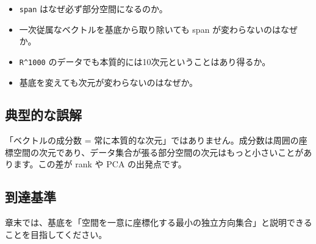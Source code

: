 \documentclass[
  11pt,
  a4paper,
]{ltjsarticle}
\providecommand{\tightlist}{%
  \setlength{\itemsep}{0pt}\setlength{\parskip}{0pt}}
\begin{document}
\begin{itemize}
\tightlist
\item
  \texttt{span} はなぜ必ず部分空間になるのか。
\item
  一次従属なベクトルを基底から取り除いても span が変わらないのはなぜか。
\item
  \texttt{R\^{}1000}
  のデータでも本質的には10次元ということはあり得るか。
\item
  基底を変えても次元が変わらないのはなぜか。
\end{itemize}

\hypertarget{ux5178ux578bux7684ux306aux8aa4ux89e3}{%
\subsection{典型的な誤解}\label{ux5178ux578bux7684ux306aux8aa4ux89e3}}

「ベクトルの成分数 =
常に本質的な次元」ではありません。成分数は周囲の座標空間の次元であり、データ集合が張る部分空間の次元はもっと小さいことがあります。この差が
rank や PCA の出発点です。

\hypertarget{ux5230ux9054ux57faux6e96}{%
\subsection{到達基準}\label{ux5230ux9054ux57faux6e96}}

章末では、基底を「空間を一意に座標化する最小の独立方向集合」と説明できることを目指してください。
\end{document}
